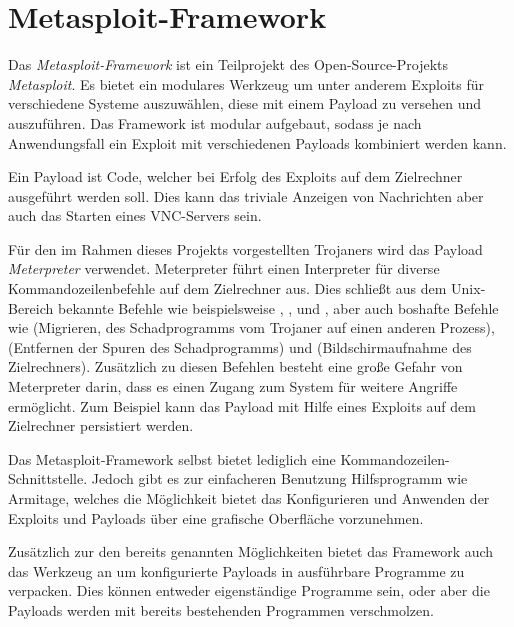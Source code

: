 \section{Metasploit-Framework \cite{MSPLH}}\label{sec:metasploit}
Das \textit{Metasploit-Framework} ist ein Teilprojekt des Open-Source-Projekts \textit{Metasploit}.
Es bietet ein modulares Werkzeug um unter anderem Exploits für verschiedene Systeme auszuwählen,
diese mit einem Payload zu versehen und auszuführen. Das Framework ist modular aufgebaut, sodass je nach Anwendungsfall ein Exploit mit verschiedenen Payloads kombiniert werden kann.

Ein Payload ist Code, welcher bei Erfolg des Exploits auf dem Zielrechner ausgeführt werden soll.
Dies kann das triviale Anzeigen von Nachrichten aber auch das Starten eines VNC-Servers sein.

Für den im Rahmen dieses Projekts vorgestellten Trojaners wird das Payload \textit{Meterpreter} \cite{OSMTP} verwendet.
Meterpreter führt einen Interpreter für diverse Kommandozeilenbefehle auf dem Zielrechner aus.
Dies schließt aus dem Unix-Bereich bekannte Befehle wie beispielsweise , ,  und ,
aber auch boshafte Befehle wie  (Migrieren, des Schadprogramms vom Trojaner auf einen anderen Prozess),
 (Entfernen der Spuren des Schadprogramms) und  (Bildschirmaufnahme des Zielrechners).
Zusätzlich zu diesen Befehlen besteht eine große Gefahr von Meterpreter darin, dass es einen Zugang zum System für weitere Angriffe ermöglicht.
Zum Beispiel kann das Payload mit Hilfe eines Exploits auf dem Zielrechner persistiert werden.

Das Metasploit-Framework selbst bietet lediglich eine Kommandozeilen-Schnittstelle.
Jedoch gibt es zur einfacheren Benutzung Hilfsprogramm wie Armitage,
welches die Möglichkeit bietet das Konfigurieren und Anwenden der Exploits und Payloads über eine grafische Oberfläche vorzunehmen.

Zusätzlich zur den bereits genannten Möglichkeiten bietet das Framework auch das Werkzeug  an um konfigurierte Payloads in ausführbare Programme zu verpacken.
Dies können entweder eigenständige Programme sein, oder aber die Payloads werden mit bereits bestehenden Programmen verschmolzen. 